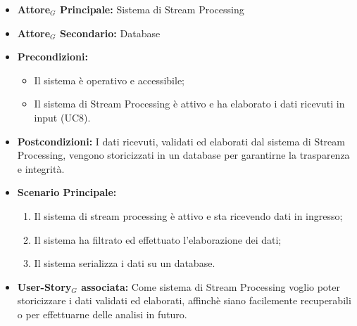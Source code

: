\documentclass[11pt]{article}
\begin{document}
\begin{justify}
\label{UC9}
\begin{itemize}
    \item \textbf{Attore$_G$ Principale:} Sistema di Stream Processing
    \item \textbf{Attore$_G$ Secondario:} Database
    \item \textbf{Precondizioni:} 
        \begin{itemize}
          \item Il sistema è operativo e accessibile;
            \item Il sistema di Stream Processing è attivo e ha elaborato i dati ricevuti in input (UC8).
        \end{itemize}
      \item \textbf{Postcondizioni:} I dati ricevuti, validati ed elaborati dal sistema di Stream Processing, vengono storicizzati in un database per garantirne la trasparenza e integrità.\\
    \item \textbf{Scenario Principale:} 
        \begin{enumerate}
        \item Il sistema di stream processing è attivo e sta ricevendo dati in ingresso;
        \item Il sistema ha filtrato ed effettuato l'elaborazione dei dati;
        \item Il sistema serializza i dati su un database. 
        \end{enumerate}
    \item \textbf{User-Story$_G$ associata:} Come sistema di Stream Processing voglio poter storicizzare i dati validati ed elaborati, affinchè siano facilemente recuperabili o per effettuarne delle analisi in futuro.
\end{itemize}



\end{justify}
\end{document}

